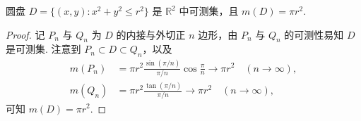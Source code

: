\documentclass[../../main.tex]{subfiles}
\begin{document}
\begin{example}
圆盘 \(D = \{ (x,y): x^2 + y^2 \leqslant r^2\}\) 是 \(\mathbb{R}^2\) 中可测集，且 \(m(D)=\pi r^2\).
\end{example}
\begin{proof}
记 \(P_n\) 与 \(Q_n\) 为 \(D\) 的内接与外切正 \(n\) 边形，由 \(P_n\) 与 \(Q_n\) 的可测性易知 \(D\) 是可测集. 注意到 \(P_n \subset D \subset Q_n\)，以及
\begin{align*}
m(P_n) &= \pi r^2 \frac{\sin(\pi/n)}{\pi/n} \cos\frac{\pi}{n} \to \pi r^2 \quad (n \to \infty),\\
m(Q_n) &= \pi r^2 \frac{\tan(\pi/n)}{\pi/n} \to \pi r^2 \quad (n \to \infty),
\end{align*}
可知 \(m(D)=\pi r^2\).

\end{proof}
\end{document}
